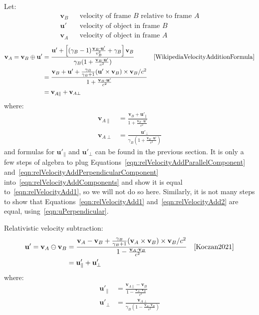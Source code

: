 \documentclass[a4paper]{article}
\theoremstyle{plain}
\theoremstyle{definition}
\newcommand{\vect}[1]{\mathbf{#1}}
\begin{document}
Let:
\begin{align*}
  \vect{v}_B & & \text{velocity of frame $B$ relative to frame $A$} \\
  \vect{u}' & & \text{velocity of object in frame $B$} \\
  \vect{v}_A & & \text{velocity of object in frame $A$}
\end{align*}
\begin{align}
\vect{v}_A = \vect{v}_B \oplus \vect{u}'
  & = \frac{ \vect{u}' + \left[ (\gamma_B-1) \frac{\vect{v}_B \cdot \vect{u}'}{v_B^2} + \gamma_B \right] \vect{v}_B }
           { \gamma_B (1 + \frac{\vect{v}_B \cdot \vect{u}'}{c^2}) } & & \text{\cite{WikipediaVelocityAdditionFormula}} \label{eqn:relVelocityAdd1} \\
  & = \frac{ \vect{v}_B + \vect{u}' + \frac{\gamma_B}{\gamma_B+1} (\vect{u}' \times \vect{v}_B) \times \vect{v}_B / c^2 }
           { 1 + \frac{\vect{v}_B \cdot \vect{u}'}{c^2} } \label{eqn:relVelocityAdd2} \\
  & = \vect{v}_{A \parallel} + \vect{v}_{A \perp} \label{eqn:relVelocityAddComponents}
\end{align}
where:
\begin{align}
\vect{v}_{A \parallel}
  & = \frac{ \vect{v}_B + \vect{u}'_{\parallel} }{1 + \frac{ \vect{v}_B \cdot \vect{u}'}{c^2} } \label{eqn:relVelocityAddParallelComponent} \\
\vect{v}_{A \perp}
  & = \frac{ \vect{u}'_{\perp} }{\gamma_B (1 + \frac{ \vect{v}_B \cdot \vect{u}'}{c^2} )} \label{eqn:relVelocityAddPerpendicularComponent}
\end{align}
and formulas for $\vect{u}'_{\parallel}$ and $\vect{u}'_{\perp}$ can
be found in the previous section.  It is only a few steps of algebra
to plug Equations~\eqref{eqn:relVelocityAddParallelComponent}
and~\eqref{eqn:relVelocityAddPerpendicularComponent}
into~\eqref{eqn:relVelocityAddComponents} and show it is equal
to~\eqref{eqn:relVelocityAdd1}, so we will not do so here.
Similarly, it is not many steps to show that
Equations~\eqref{eqn:relVelocityAdd1} and~\eqref{eqn:relVelocityAdd2}
are equal, using~\eqref{eqn:uPerpendicular}.

Relativistic velocity subtraction:
\begin{align}
\vect{u}' = \vect{v}_A \ominus \vect{v}_B
  & = \frac{ \vect{v}_A - \vect{v}_B + \frac{\gamma_B}{\gamma_B+1} (\vect{v}_A \times \vect{v}_B) \times \vect{v}_B / c^2 }
           { 1 - \frac{\vect{v}_A \cdot \vect{v}_B}{c^2} } & & \text{\cite{Koczan2021}} \\
  & = \vect{u}'_{\parallel} + \vect{u}'_{\perp} \label{eqn:relVelocitySubComponents}
\end{align}
where:
\begin{align}
\vect{u}'_{\parallel}
  & = \frac{ \vect{v}_{A \parallel} - \vect{v}_B}{1 - \frac{ \vect{v}_A \cdot \vect{v}_B}{c^2} } \label{eqn:relVelocitySubParallelComponent} \\
\vect{u}'_{\perp}
  & = \frac{ \vect{v}_{A \perp} }{\gamma_B (1 - \frac{ \vect{v}_A \cdot \vect{v}_B}{c^2} )} \label{eqn:relVelocitySubPerpendicularComponent}
\end{align}
\end{document}
